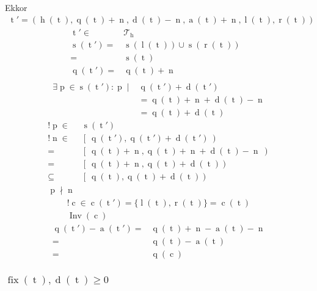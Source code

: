 \documentclass{article}
\newcommand*{\Trees}{\ensuremath{\mathcal{T}}}
\newcommand*{\fFix}{\ensuremath{\operatorname{fix}}}
\newcommand*{\fInv}{\ensuremath{\operatorname{Inv}}}
\newcommand*{\sAccumulated}[1]{\ensuremath{\operatorname{a}\left(#1\right)}}
\newcommand*{\sChildren}[1]{\ensuremath{\operatorname{c}\left(#1\right)}}
\newcommand*{\sDiff}[1]{\ensuremath{\operatorname{d}\left(#1\right)}}
\newcommand*{\sHeight}[1]{\ensuremath{\operatorname{h}\left(#1\right)}}
\newcommand*{\sLeft}[1]{\ensuremath{\operatorname{l}\left(#1\right)}}
\newcommand*{\sPosition}[1]{\ensuremath{\operatorname{q}\left(#1\right)}}
\newcommand*{\sPrimes}[1]{\ensuremath{\operatorname{s}\left(#1\right)}}
\newcommand*{\sRight}[1]{\ensuremath{\operatorname{r}\left(#1\right)}}
\newcommand*{\vC}{\ensuremath{\operatorname{c}}}
\newcommand*{\vH}{\ensuremath{\operatorname{h}}}
\newcommand*{\vN}{\ensuremath{\operatorname{n}}}
\newcommand*{\vP}{\ensuremath{\operatorname{p}}}
\newcommand*{\vT}{\ensuremath{\operatorname{t}}}
\begin{document}
Ekkor
\begin{align*}
\vT' = ( \sHeight{\vT},
	\sPosition{\vT} + \vN,
	\sDiff{\vT} - \vN,
	\sAccumulated{\vT} + \vN,
	\sLeft{\vT},
	\sRight{\vT})
\end{align*}
\begin{align*}
\vT' \in& \Trees_{\vH} \tag{M1} \\
\sPrimes{\vT'} =& \sPrimes{\sLeft{\vT}} \cup \sPrimes{\sRight{\vT}} & \\
	=& \sPrimes{\vT} \tag{M2} \\
\sPosition{\vT'} =& \sPosition{\vT} + \vN \tag{M3} \\
\end{align*}
\begin{align*}
\exists \vP \in \sPrimes{\vT'}: \vP \mid & \sPosition{\vT'} + \sDiff{\vT'} \\
	& = \sPosition{\vT} + \vN + \sDiff{\vT} - \vN \\
	& = \sPosition{\vT} + \sDiff{\vT} \tag{I1}
\end{align*}
\begin{align*}
! \vP \in& \sPrimes{\vT'} \\
! \vN \in& \left[\ \sPosition{\vT'} , \sPosition{\vT'} + \sDiff{\vT'}\ \right) \\
=& \left[\ \sPosition{\vT}+\vN, \sPosition{\vT}+\vN+\sDiff{\vT}-\vN\ \right) \\
=& \left[\ \sPosition{\vT} + \vN , \sPosition{\vT} + \sDiff{\vT} \right) \\
\subseteq&  \left[\ \sPosition{\vT} , \sPosition{\vT} + \sDiff{\vT} \right) \\
\vP \nmid \vN \tag{I2}
\end{align*}
\begin{align*}
! \vC \in \sChildren{\vT'} = \{ \sLeft{\vT}, \sRight{\vT} \} = \sChildren{\vT} \\
\fInv(\vC) \tag{I3}
\end{align*}
\begin{align*}
\sPosition{\vT'} - \sAccumulated{\vT'}
	=& \sPosition{\vT} + \vN - \sAccumulated{\vT} - \vN \\
	=& \sPosition{\vT} - \sAccumulated{\vT} \\
	=& \sPosition{\vC} \tag{I4, M4}
\end{align*}

\subsubsection{$ \fFix(\vT), \sDiff{\vT} \ge 0 $}
\end{document}
